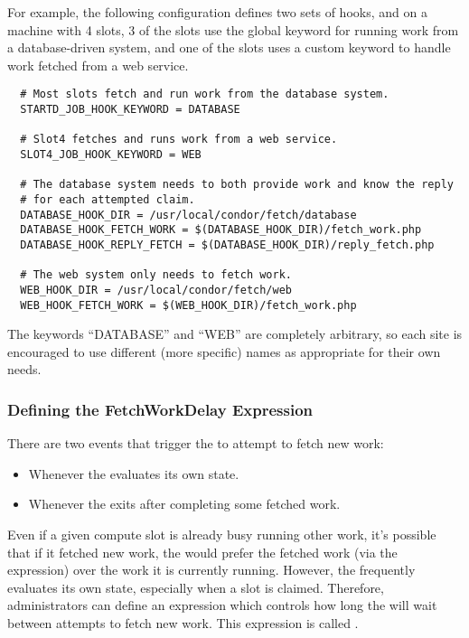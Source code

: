For example, the following configuration defines two sets of hooks,
and on a machine with 4 slots, 3 of the slots use the global keyword
for running work from a database-driven system, and one of the slots
uses a custom keyword to handle work fetched from a web service.
\begin{verbatim}
  # Most slots fetch and run work from the database system.
  STARTD_JOB_HOOK_KEYWORD = DATABASE

  # Slot4 fetches and runs work from a web service.
  SLOT4_JOB_HOOK_KEYWORD = WEB

  # The database system needs to both provide work and know the reply
  # for each attempted claim.
  DATABASE_HOOK_DIR = /usr/local/condor/fetch/database
  DATABASE_HOOK_FETCH_WORK = $(DATABASE_HOOK_DIR)/fetch_work.php
  DATABASE_HOOK_REPLY_FETCH = $(DATABASE_HOOK_DIR)/reply_fetch.php

  # The web system only needs to fetch work.
  WEB_HOOK_DIR = /usr/local/condor/fetch/web
  WEB_HOOK_FETCH_WORK = $(WEB_HOOK_DIR)/fetch_work.php
\end{verbatim}

The keywords ``DATABASE'' and ``WEB'' are completely arbitrary, so
each site is encouraged to use different (more specific) names as
appropriate for their own needs.


\subsubsection{\label{sec:job-hooks-fetch-work-delay}
Defining the FetchWorkDelay Expression}

There are two events that trigger the  to attempt to
fetch new work:
\begin{itemize}
\item Whenever the  evaluates its own state.
\item Whenever the  exits after completing some
  fetched work.
\end{itemize}

Even if a given compute slot is already busy running other work, it's
possible that if it fetched new work, the  would prefer
the fetched work (via the  expression) over the work it
is currently running.
However, the  frequently evaluates its own state,
especially when a slot is claimed.
Therefore, administrators can define an expression which controls how
long the  will wait between attempts to fetch new work.
This expression is called .

